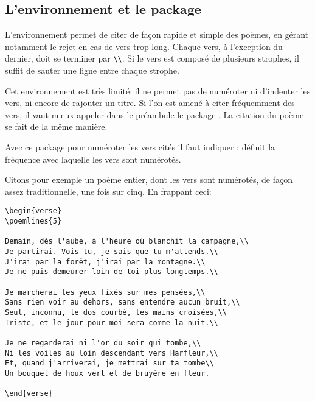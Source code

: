 \subsection{L'environnement  et le package }


L'environnement   permet de citer de façon rapide et simple des poèmes, en gérant notamment le rejet en cas de vers trop long. Chaque vers, à l'exception du dernier, doit se terminer par \verb|\\|. Si le vers est composé de plusieurs strophes, il suffit de sauter une ligne entre chaque strophe.    

Cet environnement est très limité: il ne permet pas de numéroter ni d'indenter les vers, ni encore de rajouter un titre. Si l'on est amené à citer fréquemment des vers, il vaut mieux appeler dans le préambule le package . La citation du poème se fait de la même manière.


Avec ce package pour numéroter les vers cités il faut indiquer  :   
définit la fréquence avec laquelle les vers sont numérotés. 


Citons pour  exemple un poème entier, dont les vers sont numérotés, de façon assez traditionnelle, une fois sur cinq. En frappant ceci:
\begin{verbatim}
\begin{verse}
\poemlines{5}

Demain, dès l'aube, à l'heure où blanchit la campagne,\\
Je partirai. Vois-tu, je sais que tu m'attends.\\
J'irai par la forêt, j'irai par la montagne.\\
Je ne puis demeurer loin de toi plus longtemps.\\

Je marcherai les yeux fixés sur mes pensées,\\
Sans rien voir au dehors, sans entendre aucun bruit,\\
Seul, inconnu, le dos courbé, les mains croisées,\\
Triste, et le jour pour moi sera comme la nuit.\\

Je ne regarderai ni l'or du soir qui tombe,\\
Ni les voiles au loin descendant vers Harfleur,\\
Et, quand j'arriverai, je mettrai sur ta tombe\\
Un bouquet de houx vert et de bruyère en fleur.

\end{verse}
\end{verbatim}

